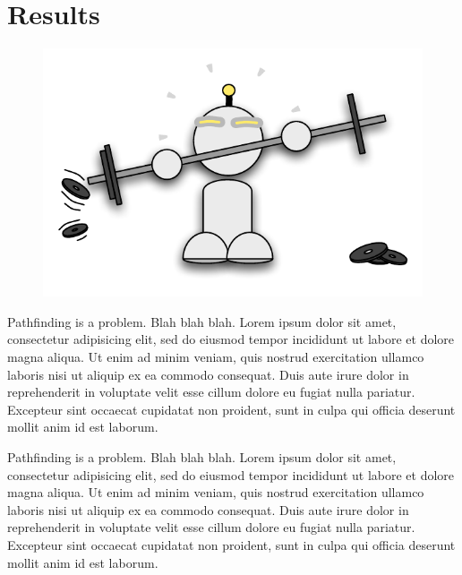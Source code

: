 \section{Results}
 \begin{figure}
		\includegraphics[width=0.39\columnwidth, trim = 10mm 10mm 10mm 10mm]{diagrams/robot_weights.pdf}
 \end{figure}

Pathfinding is a problem. Blah blah blah.
Lorem ipsum dolor sit amet, consectetur adipisicing elit, sed do eiusmod
tempor incididunt ut labore et dolore magna aliqua. Ut enim ad minim
veniam, quis nostrud exercitation ullamco laboris nisi ut aliquip ex ea
commodo consequat. Duis aute irure dolor in reprehenderit in voluptate
velit esse cillum dolore eu fugiat nulla pariatur. Excepteur sint occaecat
cupidatat non proident, sunt in culpa qui officia deserunt mollit anim
id est laborum.

Pathfinding is a problem. Blah blah blah.
Lorem ipsum dolor sit amet, consectetur adipisicing elit, sed do eiusmod
tempor incididunt ut labore et dolore magna aliqua. Ut enim ad minim
veniam, quis nostrud exercitation ullamco laboris nisi ut aliquip ex ea
commodo consequat. Duis aute irure dolor in reprehenderit in voluptate
velit esse cillum dolore eu fugiat nulla pariatur. Excepteur sint occaecat
cupidatat non proident, sunt in culpa qui officia deserunt mollit anim
id est laborum.

